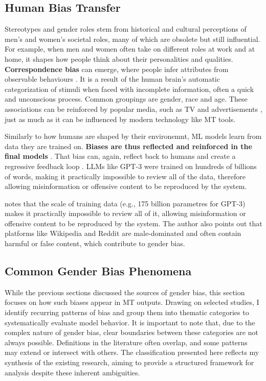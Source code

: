 \subsection{Human Bias Transfer}
Stereotypes and gender roles stem from historical and cultural perceptions of men's and women's societal roles, many of which are obsolete but still influential. For example, when men and women often take on different roles at work and at home, it shapes how people think about their personalities and qualities. \textbf{Correspondence bias} can emerge, where people infer attributes from observable behaviours \citep{godsilEffectsGenderRoles2016}. It is a result of the human brain's automatic categorization of stimuli when faced with incomplete information, often a quick and unconscious process. Common groupings are gender, race and age. These associations can be reinforced by popular media, such as TV and advertisements \citep{godsilEffectsGenderRoles2016}, just as much as it can be influenced by modern technology like MT tools. 

Similarly to how humans are shaped by their environemnt, ML models learn from data they are trained on. \textbf{Biases are thus reflected and reinforced in the final models} \citep{stanczakSurveyGenderBias2021,smacchiaDoesAIReflect2024}. That bias can, again, reflect back to humans and create a regressive feedback loop \citep{barclayInvestigatingMarkersDrivers2024a,shresthaExploringGenderBiases2022}. LLMs like GPT-3 were trained on hundreds of billions of words, making it practically impossible to review all of the data, therefore allowing misinformation or offensive content to be reproduced by the system.

\citet{ullmannGenderBiasMachine2022} notes that the scale of training data (e.g., 175 billion parametres for GPT-3) makes it practically impossible to review all of it, allowing misinformation or offensive content to be reproduced by the system. The author also points out that platforms like Wikipedia and Reddit are male-dominated and often contain harmful or false content, which contribute to gender bias.

\subsection{Common Gender Bias Phenomena}
While the previous sections discussed the sources of gender bias, this section focuses on how such biases appear in MT outputs. Drawing on selected studies, I identify recurring patterns of bias and group them into thematic categories to systematically evaluate model behavior. It is important to note that, due to the complex nature of gender bias, clear boundaries between these categories are not always possible. Definitions in the literature often overlap, and some patterns may extend or intersect with others. The classification presented here reflects my synthesis of the existing research, aiming to provide a structured framework for analysis despite these inherent ambiguities.

